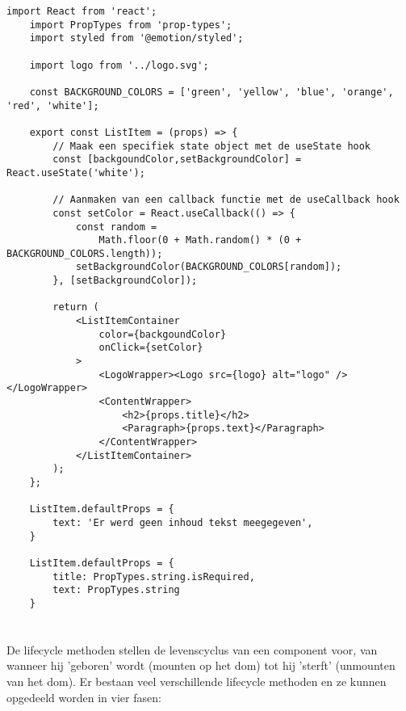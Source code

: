 \newpage
\begin{lstlisting}[caption=Statefull functioneel component, label={fig:funcCompWithProps&State}]
    import React from 'react';
    import PropTypes from 'prop-types';
    import styled from '@emotion/styled';
    
    import logo from '../logo.svg';
    
    const BACKGROUND_COLORS = ['green', 'yellow', 'blue', 'orange', 'red', 'white'];
    
    export const ListItem = (props) => {
        // Maak een specifiek state object met de useState hook
        const [backgoundColor,setBackgroundColor] = React.useState('white');
        
        // Aanmaken van een callback functie met de useCallback hook
        const setColor = React.useCallback(() => {
            const random = 
                Math.floor(0 + Math.random() * (0 + BACKGROUND_COLORS.length));
            setBackgroundColor(BACKGROUND_COLORS[random]);
        }, [setBackgroundColor]);
        
        return (
            <ListItemContainer
                color={backgoundColor} 
                onClick={setColor}
            >
                <LogoWrapper><Logo src={logo} alt="logo" /></LogoWrapper>
                <ContentWrapper>
                    <h2>{props.title}</h2>
                    <Paragraph>{props.text}</Paragraph>
                </ContentWrapper>
            </ListItemContainer>
        );                
    };
    
    ListItem.defaultProps = {
        text: 'Er werd geen inhoud tekst meegegeven',
    }
    
    ListItem.defaultProps = {
        title: PropTypes.string.isRequired,
        text: PropTypes.string
    }
\end{lstlisting}

\section{}
\label{sec:lifecycleMethoden}

De lifecycle methoden stellen de levenscyclus van een component voor, van wanneer hij 'geboren' wordt (mounten op het \gls{dom}) tot hij 'sterft' (unmounten van het \gls{dom}). Er bestaan veel verschillende lifecycle methoden en ze kunnen opgedeeld worden in vier fasen:

